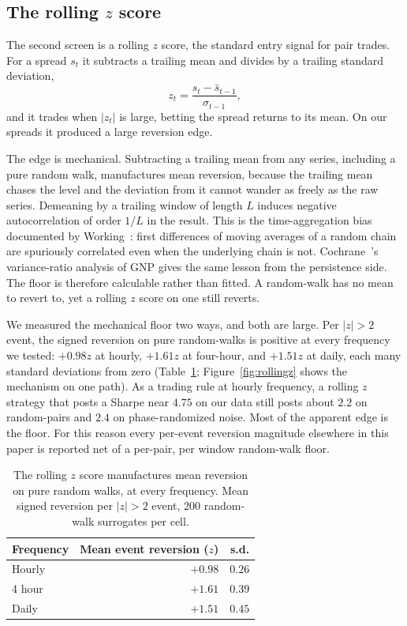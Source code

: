 \documentclass[11pt]{article}
\begin{document}
\subsection{The rolling $z$ score}
\label{sec:rollingz}

The second screen is a rolling $z$ score, the standard entry signal for pair trades. For a
spread $s_t$ it subtracts a trailing mean and divides by a trailing standard deviation,
\[
z_t = \frac{s_t - \bar{s}_{t-1}}{\sigma_{t-1}},
\]
and it trades when $|z_t|$ is large, betting the spread returns to its mean. On our spreads it
produced a large reversion edge.

The edge is mechanical. Subtracting a trailing mean from any series, including a pure random
walk, manufactures mean reversion, because the trailing mean chases the level and the deviation
from it cannot wander as freely as the raw series. Demeaning by a trailing window of length $L$
induces negative autocorrelation of order $1/L$ in the result. This is the time-aggregation
bias documented by Working~\cite{working1960correlation}: first differences of moving
averages of a random chain are spuriously correlated even when the underlying chain is not.
Cochrane~\cite{cochrane1988random}'s variance-ratio analysis of GNP gives the same lesson
from the persistence side. The floor is therefore calculable rather than fitted. A random-walk has no mean to revert to, yet
a rolling $z$ score on one still reverts.

We measured the mechanical floor two ways, and both are large. Per $|z|>2$ event, the signed
reversion on pure random-walks is positive at every frequency we tested: $+0.98z$ at hourly,
$+1.61z$ at four-hour, and $+1.51z$ at daily, each many standard deviations from zero
(Table~\ref{tab:rollingz}; Figure~\ref{fig:rollingz} shows the mechanism on one path). As a trading rule at hourly frequency, a rolling $z$ strategy that
posts a Sharpe near $4.75$ on our data still posts about $2.2$ on random-pairs and $2.4$ on
phase-randomized noise. Most of the apparent edge is the floor. For this reason every per-event
reversion magnitude elsewhere in this paper is reported net of a per-pair, per window
random-walk floor.

\begin{table}[h]
\centering
\caption{The rolling $z$ score manufactures mean reversion on pure random walks, at every
frequency. Mean signed reversion per $|z|>2$ event, 200 random-walk surrogates per cell.}
\label{tab:rollingz}
\begin{tabular}{lrr}
\toprule
Frequency & Mean event reversion ($z$) & s.d. \\
\midrule
Hourly & $+0.98$ & $0.26$ \\
4 hour & $+1.61$ & $0.39$ \\
Daily  & $+1.51$ & $0.45$ \\
\bottomrule
\end{tabular}
\end{table}
\end{document}
